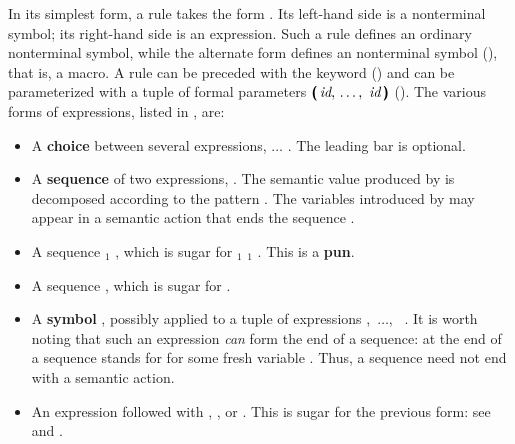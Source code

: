 \documentclass[onecolumn,11pt,nocopyrightspace,preprint]{sigplanconf}
\begin{document}
In its simplest form,
a rule takes the form
\dlet {} \dcolonequal \expression.
%
Its left-hand side  is a nonterminal symbol;
its right-hand side is an expression.
%
Such a rule defines an ordinary nonterminal symbol,
while the alternate form
\dlet {} \dequalequal \expression
defines an \dinline nonterminal symbol (),
that is, a macro.
%
A rule can be preceded with the keyword \dpublic ()
and can be parameterized with a tuple of formal parameters
$\tuple{\nt{id}}$ ().
%
The various forms of expressions, listed in , are:
%
\begin{itemize}
\item
  A \textbf{choice} between several expressions,
  \optional{\barre}
   \barre ${}\ldots{}$ \barre{}.
  The leading bar is optional.

\item
  A \textbf{sequence} of two expressions,
  \pattern \dequal {} \dsemi {}.
  The semantic value produced by 
  is decomposed according to the pattern \pattern.
  The \ocaml variables introduced by \pattern
  may appear in a semantic action
  that ends the sequence .

\item
  A sequence \dtilde \dequal {}${}_1$ \dsemi {},
  which is sugar for ${}_1$ \dequal {}${}_1$ \dsemi
  .
  This is a \textbf{pun}.

\item
  A sequence  \dsemi {},
  which is sugar for
  \dunderscore \dequal {} \dsemi {}.

\item
  A \textbf{symbol} , possibly applied to
  a tuple of expressions
  \dlpar {},\ ${}\ldots{}$,\  \drpar.
  It is worth noting that such an expression \emph{can} form the
  end of a sequence:  at the end of a sequence stands for
   \dequal {} \dsemi {}
  for some fresh variable .
  Thus, a sequence need not end with a semantic action.

\item
  An expression followed with \dquestion, \dplus, or \dstar. This is sugar
  for the previous form: see  and .


\end{itemize}
\end{document}
